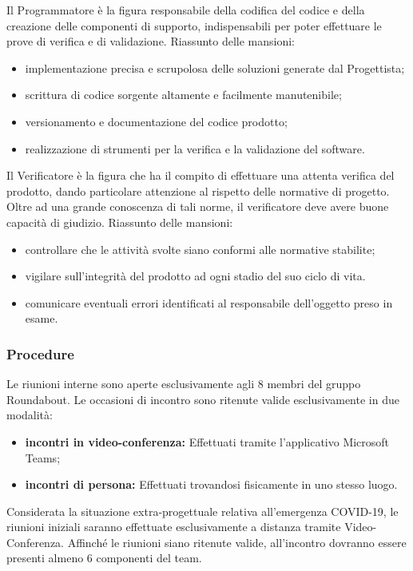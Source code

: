			Il Programmatore è la figura responsabile della codifica del codice e della creazione delle componenti di supporto, indispensabili per poter effettuare le prove di verifica e di validazione.
			Riassunto delle mansioni:
			\begin{itemize}
				\item implementazione precisa e scrupolosa delle soluzioni generate dal Progettista;
				\item scrittura di codice sorgente altamente e facilmente manutenibile;
				\item versionamento e documentazione del codice prodotto;
				\item realizzazione di strumenti per la verifica e la validazione del software.
			\end{itemize}
		
			Il Verificatore è la figura che ha il compito di effettuare una attenta verifica del prodotto, dando particolare attenzione al rispetto delle normative di progetto. Oltre ad una grande conoscenza di tali norme, il verificatore deve avere buone capacità di giudizio.
			Riassunto delle mansioni:
			\begin{itemize}
				\item controllare che le attività svolte siano conformi alle normative stabilite;
				\item vigilare sull'integrità del prodotto ad ogni stadio del suo ciclo di vita.
				\item comunicare eventuali errori identificati al responsabile dell'oggetto preso in esame.
			\end{itemize}
		
		
		\subsubsection{Procedure}
				Le riunioni interne sono aperte esclusivamente agli 8 membri del gruppo Roundabout. Le occasioni di incontro sono ritenute valide esclusivamente in due modalità:
				\begin{itemize}
					\item \textbf{incontri in video-conferenza:} Effettuati tramite l'applicativo Microsoft Teams;
					\item \textbf{incontri di persona:} Effettuati trovandosi fisicamente in uno stesso luogo.
				\end{itemize}
				Considerata la situazione extra-progettuale relativa all'emergenza COVID-19, le riunioni iniziali saranno effettuate esclusivamente a distanza tramite Video-Conferenza.
				Affinché le riunioni siano ritenute valide, all'incontro dovranno essere presenti almeno 6 componenti del team.
			
